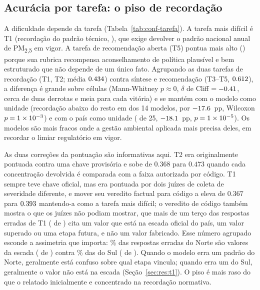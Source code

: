 \begin{table}[h]
\centering
\caption{Acurácia composta por modelo em 25 países (veredito factual por
código onde a resposta é um valor de registro, média do painel nos demais
casos; $[0,1]$). $N$ = respostas pontuadas a prompts em inglês.}
\label{tab:conf-modelo}
\footnotesize
\setlength{\tabcolsep}{8pt}
\renewcommand{\arraystretch}{1.15}

\end{table}

\subsection{Acurácia por tarefa: o piso de recordação}
\label{sec:res:tarefa}

A dificuldade depende da tarefa (Tabela~\ref{tab:conf-tarefa}). A tarefa mais
difícil é T1 (recordação do padrão técnico, \ntasktone), que exige devolver o
padrão nacional anual de PM\textsubscript{2,5} em vigor. A tarefa de
recomendação aberta (T5) pontua mais alto (\ntasktfive) porque sua rubrica
recompensa aconselhamento de política plausível e bem estruturado que não
depende de um único fato. Agrupando as duas tarefas de recordação (T1, T2;
média $0.434$) contra síntese e recomendação (T3--T5, $0.612$), a
diferença é grande sobre células (Mann-Whitney $p\approx 0$, $\delta$ de Cliff
$=-0.41$, cerca de duas derrotas e meia para cada vitória) e se mantém
com o modelo como unidade (recordação abaixo do resto em \nfloorbymodelneg{}
dos 14 modelos, por $-17.6$~pp, Wilcoxon $p=1\times10^{-3}$) e com o
país como unidade (\nfloorbyctryneg{} de 25, $-18.1$~pp,
$p=1\times10^{-5}$). Os modelos são mais fracos onde a gestão ambiental aplicada
mais precisa deles, em recordar o limiar regulatório em vigor.

As duas correções da pontuação são informativas aqui. T2 era originalmente
pontuada contra uma chave provisória e sobe de $0.368$ para $0.473$ quando cada
concentração devolvida é comparada com a faixa autorizada por código. T1 sempre
teve chave oficial, mas era pontuada por dois juízes de coleta de severidade
diferente, e mover seu veredito factual para código a eleva de $0.367$ para
$0.393$ mantendo-a como a tarefa mais difícil; o veredito de código também
mostra o que os juízes não podiam mostrar, que mais de um terço das respostas
erradas de T1 (\nladderhit{} de \nincorrectn) cita um valor que está na escada
oficial do país, um valor superado ou uma etapa futura, e não um valor
fabricado. Esse número agrupado esconde a assimetria que importa:
\nladdershgn\% das respostas erradas do Norte são valores da escada
(\nladderhitgn{} de \nincorrectgn) contra \nladdershgs\% das do Sul
(\nladderhitgs{} de \nincorrectgs). Quando o modelo erra um padrão do Norte,
geralmente está confuso sobre qual etapa vincula; quando erra um do Sul,
geralmente o valor não está na escada (Seção~\ref{sec:res:t1}). O piso é mais
raso do que o relatado inicialmente e concentrado na recordação normativa.

